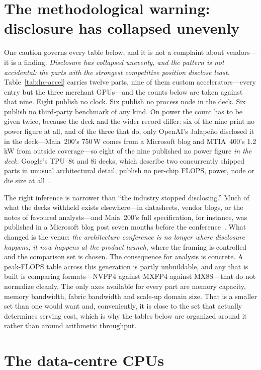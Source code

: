 \section{The methodological warning: disclosure has collapsed unevenly}

One caution governs every table below, and it is not a complaint about vendors---it is a finding. \emph{Disclosure has collapsed unevenly, and the pattern is not accidental: the parts with the strongest competitive position disclose least.} Table~\ref{tab:hc-accel} carries twelve parts, nine of them custom accelerators---every entry but the three merchant GPUs---and the counts below are taken against that nine. Eight publish no clock. Six publish no process node in the deck. Six publish no third-party benchmark of any kind. On power the count has to be given twice, because the deck and the wider record differ: six of the nine print no power figure at all, and of the three that do, only OpenAI's Jalape\~no disclosed it in the deck---Maia~200's 750\,W comes from a Microsoft blog and MTIA~400's 1.2\,kW from outside coverage---so eight of the nine published no power figure \emph{in the deck}. Google's TPU~8t and 8i decks, which describe two concurrently shipped parts in unusual architectural detail, publish no per-chip FLOPS, power, node or die size at all~\cite{hc2026-tpu8}.

The right inference is narrower than ``the industry stopped disclosing.'' Much of what the decks withheld exists elsewhere---in datasheets, vendor blogs, or the notes of favoured analysts---and Maia~200's full specification, for instance, was published in a Microsoft blog post seven months before the conference~\cite{maia200}. What changed is the venue: \emph{the architecture conference is no longer where disclosure happens; it now happens at the product launch}, where the framing is controlled and the comparison set is chosen. The consequence for analysis is concrete. A peak-FLOPS table across this generation is partly unbuildable, and any that is built is comparing formats---NVFP4 against MXFP4 against MX8S---that do not normalize cleanly. The only axes available for every part are memory capacity, memory bandwidth, fabric bandwidth and scale-up domain size. That is a smaller set than one would want and, conveniently, it is close to the set that actually determines serving cost, which is why the tables below are organized around it rather than around arithmetic throughput.

\section{The data-centre CPUs}

